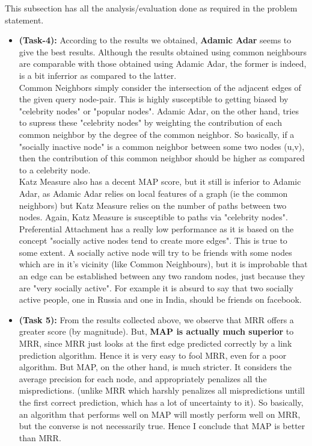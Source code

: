\documentclass[12pt, a4paper]{article}
\begin{document}
This subsection has all the analysis/evaluation done as required in the problem statement.
\begin{itemize}
\item \textbf{(Task-4):} According to the results we obtained, \textbf{Adamic Adar} seems to give the best results. Although the results obtained using common neighbours are comparable with those obtained using Adamic Adar, the former is indeed, is a bit inferrior as compared to the latter. \\
\null\quad Common Neighbors simply consider the intersection of the adjacent edges of the given query node-pair. This is highly susceptible to getting biased by "celebrity nodes" or "popular nodes". Adamic Adar, on the other hand, tries to supress these "celebrity nodes" by weighting the contribution of each common neighbor by the degree of the common neighbor. So basically, if a "socially inactive node" is a common neighbor between some two nodes (u,v), then the contribution of this common neighbor should be higher as compared to a celebrity node. \\
\null\quad Katz Measure also has a decent MAP score, but it still is inferior to Adamic Adar, as Adamic Adar relies on local features of a graph (ie the common neighbors) but Katz Measure relies on the number of paths between two nodes. Again, Katz Measure is susceptible to paths via "celebrity nodes".
\null\quad Preferential Attachment has a really low performance as it is based on the concept "socially active nodes tend to create more edges". This is true to some extent. A socially active node will try to be friends with some nodes which are in it's vicinity (like Common Neighbours), but it is improbable that an edge can be established between any two random nodes, just because they are "very socially active". For example it is absurd to say that two socially active people, one in Russia and one in India, should be friends on facebook.

\item \textbf{(Task 5):} From the results collected above, we observe that MRR offers a greater score (by magnitude). But, \textbf{MAP is actually much superior} to MRR, since MRR just looks at the first edge predicted correctly by a link prediction algorithm. Hence it is very easy to fool MRR, even for a poor algorithm. But MAP, on the other hand, is much stricter. It considers the average precision for each node, and appropriately penalizes all the mispredictions.  (unlike MRR which harshly penalizes all mispredictions untill the first correct prediction, which has a lot of uncertainty to it). So basically, an algorithm that performs well on MAP will mostly perform well on MRR, but the converse is not necessarily true. Hence I conclude that MAP is better than MRR.


\end{itemize}
\end{document}
